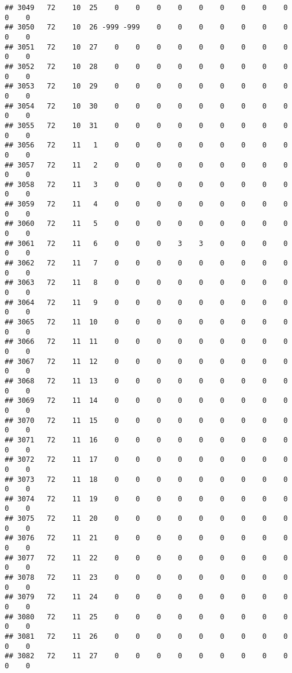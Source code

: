 \documentclass[]{article}
\begin{document}
\begin{verbatim}
## 3049   72    10  25    0    0    0    0    0    0    0    0    0    0    0
## 3050   72    10  26 -999 -999    0    0    0    0    0    0    0    0    0
## 3051   72    10  27    0    0    0    0    0    0    0    0    0    0    0
## 3052   72    10  28    0    0    0    0    0    0    0    0    0    0    0
## 3053   72    10  29    0    0    0    0    0    0    0    0    0    0    0
## 3054   72    10  30    0    0    0    0    0    0    0    0    0    0    0
## 3055   72    10  31    0    0    0    0    0    0    0    0    0    0    0
## 3056   72    11   1    0    0    0    0    0    0    0    0    0    0    0
## 3057   72    11   2    0    0    0    0    0    0    0    0    0    0    0
## 3058   72    11   3    0    0    0    0    0    0    0    0    0    0    0
## 3059   72    11   4    0    0    0    0    0    0    0    0    0    0    0
## 3060   72    11   5    0    0    0    0    0    0    0    0    0    0    0
## 3061   72    11   6    0    0    0    3    3    0    0    0    0    0    0
## 3062   72    11   7    0    0    0    0    0    0    0    0    0    0    0
## 3063   72    11   8    0    0    0    0    0    0    0    0    0    0    0
## 3064   72    11   9    0    0    0    0    0    0    0    0    0    0    0
## 3065   72    11  10    0    0    0    0    0    0    0    0    0    0    0
## 3066   72    11  11    0    0    0    0    0    0    0    0    0    0    0
## 3067   72    11  12    0    0    0    0    0    0    0    0    0    0    0
## 3068   72    11  13    0    0    0    0    0    0    0    0    0    0    0
## 3069   72    11  14    0    0    0    0    0    0    0    0    0    0    0
## 3070   72    11  15    0    0    0    0    0    0    0    0    0    0    0
## 3071   72    11  16    0    0    0    0    0    0    0    0    0    0    0
## 3072   72    11  17    0    0    0    0    0    0    0    0    0    0    0
## 3073   72    11  18    0    0    0    0    0    0    0    0    0    0    0
## 3074   72    11  19    0    0    0    0    0    0    0    0    0    0    0
## 3075   72    11  20    0    0    0    0    0    0    0    0    0    0    0
## 3076   72    11  21    0    0    0    0    0    0    0    0    0    0    0
## 3077   72    11  22    0    0    0    0    0    0    0    0    0    0    0
## 3078   72    11  23    0    0    0    0    0    0    0    0    0    0    0
## 3079   72    11  24    0    0    0    0    0    0    0    0    0    0    0
## 3080   72    11  25    0    0    0    0    0    0    0    0    0    0    0
## 3081   72    11  26    0    0    0    0    0    0    0    0    0    0    0
## 3082   72    11  27    0    0    0    0    0    0    0    0    0    0    0

\end{verbatim}
\end{document}
